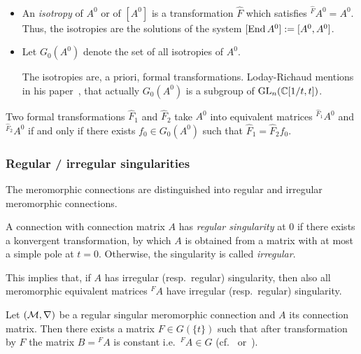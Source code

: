 \begin{defn}
  \begin{itemize}
    \item An \emph{isotropy} of $A^0$ or of $[A^0]$ is a transformation
      $\hat F$ which satisfies ${}^{\hat F}\!A^0=A^0$.
      Thus, the isotropies are the solutions of the system
      $[\operatorname{End} A^0]:=[A^0,A^0]$.
    \item Let $G_0(A^0)$ denote the set of all isotropies of $A^0$.
      \begin{s-rem}
        The isotropies are, a priori, formal transformations.
        Loday-Richaud mentions in his paper~\cite[853]{Loday1994}, that
        actually $G_0(A^0)$ is a subgroup of $\operatorname{GL}_n(\mathbb{C}[1/t,t])$.
      \end{s-rem}
  \end{itemize}
\end{defn}
\begin{lem}
  Two formal transformations $\hat F_1$ and $\hat F_2$ take $A^0$ into
  equivalent matrices ${}^{\hat F_1}\!A^0$ and  ${}^{\hat F_2}\!A^0$ if and
  only if there exists $f_0\in G_0(A^0)$ such that $\hat F_1=\hat F_2f_0$.
\end{lem}
\begin{comment}
  \begin{proof}
    \TODO[Look at \cite{BJL1979Birkhoff}?]
  \end{proof}
\end{comment}

\subsubsection{Regular / irregular singularities}
The meromorphic connections are distinguished into regular and irregular
meromorphic connections.
\begin{defn}
  A connection with connection matrix $A$ has \emph{regular singularity} at $0$
  if there exists a konvergent transformation, by which $A$ is obtained from a
  matrix with at most a simple pole at $t=0$.
  Otherwise, the singularity is called \emph{irregular}.
  \begin{s-rem}
    This implies that, if $A$ has irregular (resp.\ regular) singularity, then
    also all meromorphic equivalent matrices ${}^{F}\!A$ have irregular
    (resp.\ regular) singularity.
  \end{s-rem}
\end{defn}
\begin{thm}
  Let $(\mathcal{M},\nabla)$ be a regular singular meromorphic connection and $A$ its
  connection matrix.
  Then there exists a matrix $F\in G(\!\{t\}\!)$ such that after transformation
  by $F$ the matrix $B={}^F\!A$ is constant i.e.\ ${}^F\!A\in G$
  (cf.~\cite[Thm.II.2.8]{sabbah2007isomonodromic}
  or~\cite[Sec.5.1.2]{hotta2008}).
\end{thm}

